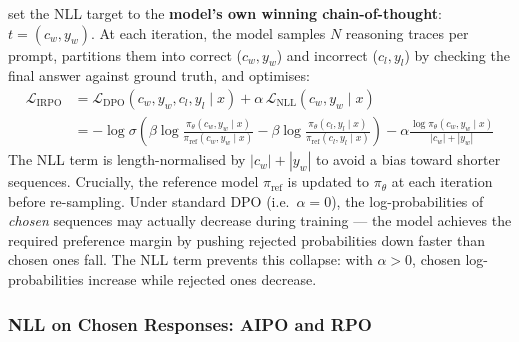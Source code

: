 \documentclass[11pt]{article}
\begin{document}
\autocite{pang2024iterativereasoningpreferenceoptimization} set the NLL target to the \textbf{model's own winning chain-of-thought}: $t = (c_w, y_w)$. At each iteration, the model samples $N$ reasoning traces per prompt, partitions them into correct ($c_w, y_w$) and incorrect ($c_l, y_l$) by checking the final answer against ground truth, and optimises:
\begin{align}
    \mathcal{L}_{\text{IRPO}} & = \mathcal{L}_{\text{DPO}}(c_w, y_w, c_l, y_l \mid x) + \alpha\,\mathcal{L}_{\text{NLL}}(c_w, y_w \mid x) \nonumber                                                                                                                                              \\
                              & = -\log \sigma\!\left(\beta \log \frac{\pi_\theta(c_w, y_w \mid x)}{\pi_{\text{ref}}(c_w, y_w \mid x)} - \beta \log \frac{\pi_\theta(c_l, y_l \mid x)}{\pi_{\text{ref}}(c_l, y_l \mid x)}\right) - \alpha \frac{\log \pi_\theta(c_w, y_w \mid x)}{|c_w| + |y_w|}
    \label{eq:irpo}
\end{align}
The NLL term is length-normalised by $|c_w| + |y_w|$ to avoid a bias toward shorter sequences. Crucially, the reference model $\pi_{\text{ref}}$ is updated to $\pi_\theta$ at each iteration before re-sampling. Under standard DPO (i.e.\ $\alpha = 0$), the log-probabilities of \emph{chosen} sequences may actually decrease during training --- the model achieves the required preference margin by pushing rejected probabilities down faster than chosen ones fall. The NLL term prevents this collapse: with $\alpha > 0$, chosen log-probabilities increase while rejected ones decrease.

\subsubsection{NLL on Chosen Responses: AIPO and RPO}
\label{sec:aipo}
\label{sec:rpo}
\end{document}
